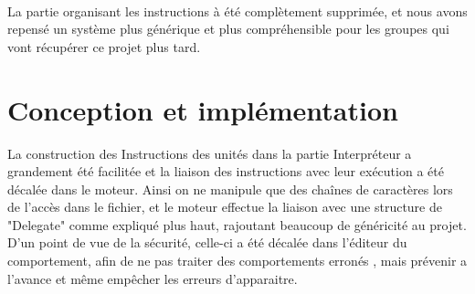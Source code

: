 \documentclass{report}
\begin{document}
\paragraph{}
\newpage
La partie organisant les instructions à été complètement supprimée, et nous avons repensé un système plus générique et plus compréhensible pour les groupes qui vont récupérer ce projet plus tard.
\section{Conception et implémentation}
La construction des Instructions des unités dans la partie Interpréteur a grandement été facilitée et la liaison des instructions avec leur exécution a été décalée dans le moteur. Ainsi on ne manipule que des chaînes de caractères lors de l'accès dans le fichier, et le moteur effectue la liaison avec une structure de "Delegate" comme expliqué plus haut, rajoutant beaucoup de généricité au projet.
D'un point de vue de la sécurité, celle-ci a été décalée dans l'éditeur du comportement, afin de ne pas traiter des comportements erronés , mais prévenir a l'avance et même empêcher les erreurs d'apparaitre.
\end{document}
